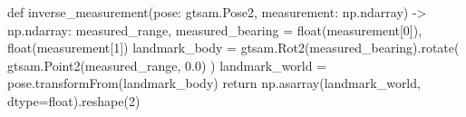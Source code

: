 \begin{pythoncode}
def inverse_measurement(pose: gtsam.Pose2, measurement: np.ndarray) -> np.ndarray:
    measured_range, measured_bearing = float(measurement[0]), float(measurement[1])
    landmark_body = gtsam.Rot2(measured_bearing).rotate(
        gtsam.Point2(measured_range, 0.0)
    )
    landmark_world = pose.transformFrom(landmark_body)
    return np.asarray(landmark_world, dtype=float).reshape(2)
\end{pythoncode}
